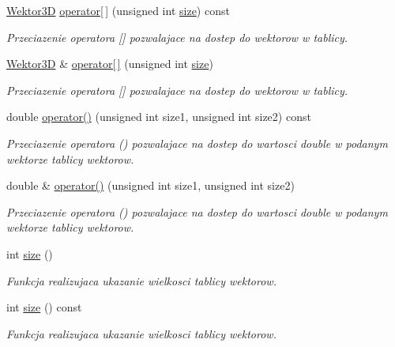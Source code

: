 \begin{DoxyCompactItemize}
\item 
\hyperlink{class_wektor3_d}{Wektor3D} \hyperlink{class_powierzchnia_a0ade86d34d549ffab3288f54185df0f5}{operator\mbox{[}$\,$\mbox{]}} (unsigned int \hyperlink{class_powierzchnia_a9ec2cb128f77750a89995e8065fee3c4}{size}) const
\begin{DoxyCompactList}\small\item\em Przeciazenie operatora \mbox{[}\mbox{]} pozwalajace na dostep do wektorow w tablicy. \end{DoxyCompactList}\item 
\hyperlink{class_wektor3_d}{Wektor3D} \& \hyperlink{class_powierzchnia_a8d69764400f092f37d3a401bf4875c34}{operator\mbox{[}$\,$\mbox{]}} (unsigned int \hyperlink{class_powierzchnia_a9ec2cb128f77750a89995e8065fee3c4}{size})
\begin{DoxyCompactList}\small\item\em Przeciazenie operatora \mbox{[}\mbox{]} pozwalajace na dostep do wektorow w tablicy. \end{DoxyCompactList}\item 
double \hyperlink{class_powierzchnia_ad0843dc06dba95cea7578f60695064f2}{operator()} (unsigned int size1, unsigned int size2) const
\begin{DoxyCompactList}\small\item\em Przeciazenie operatora () pozwalajace na dostep do wartosci double w podanym wektorze tablicy wektorow. \end{DoxyCompactList}\item 
double \& \hyperlink{class_powierzchnia_a40f99424854030714cd447cf5824f888}{operator()} (unsigned int size1, unsigned int size2)
\begin{DoxyCompactList}\small\item\em Przeciazenie operatora () pozwalajace na dostep do wartosci double w podanym wektorze tablicy wektorow. \end{DoxyCompactList}\item 
int \hyperlink{class_powierzchnia_a9ec2cb128f77750a89995e8065fee3c4}{size} ()
\begin{DoxyCompactList}\small\item\em Funkcja realizujaca ukazanie wielkosci tablicy wektorow. \end{DoxyCompactList}\item 
int \hyperlink{class_powierzchnia_a27dc891c3c0dd476c6c3b51389a85d08}{size} () const
\begin{DoxyCompactList}\small\item\em Funkcja realizujaca ukazanie wielkosci tablicy wektorow. \end{DoxyCompactList}\end{DoxyCompactItemize}
